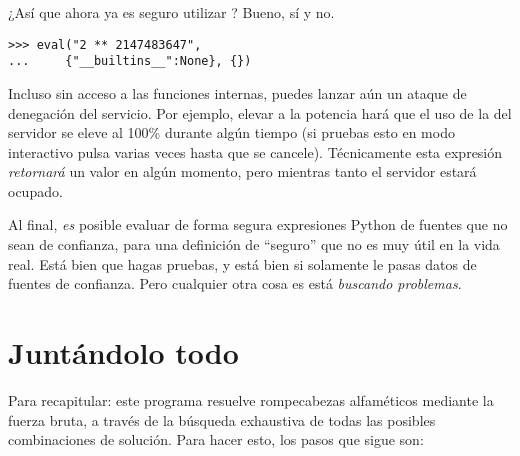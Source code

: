 ¿Así que ahora ya es seguro utilizar ? Bueno, sí y no.

\noindent\begin{minipage}{\textwidth}
\begin{lstlisting}[mathescape=True]
>>> eval("2 ** 2147483647",
...     {"__builtins__":None}, {})
\end{lstlisting}
\end{minipage}

Incluso sin acceso a las funciones internas, puedes lanzar aún un ataque de denegación del servicio. Por ejemplo, elevar  a la potencia  hará que el uso de la  del servidor se eleve al 100\% durante algún tiempo (si pruebas esto en modo interactivo pulsa  varias veces hasta que se cancele). Técnicamente esta expresión \emph{retornará} un valor en algún momento, pero mientras tanto el servidor estará ocupado.

Al final, \emph{es} posible evaluar de forma segura expresiones Python de fuentes que no sean de confianza, para una definición de ``seguro'' que no es muy útil en la vida real. Está bien que hagas pruebas, y está bien si solamente le pasas datos de fuentes de confianza. Pero cualquier otra cosa es está \emph{buscando problemas}.

\section{Juntándolo todo}

Para recapitular: este programa resuelve rompecabezas alfaméticos mediante la fuerza bruta, a través de la búsqueda exhaustiva de todas las posibles combinaciones de solución. Para hacer esto, los pasos que sigue son:

